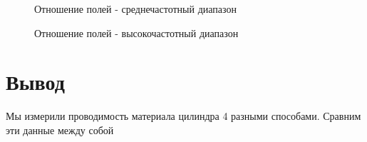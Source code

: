 \documentclass[a4paper]{article}
\begin{document}
\newpage

\begin{figure}[h]
    \caption{Отношение полей - среднечастотный диапазон}\label{fig:mid_freq_ratio}
    \caption{Отношение полей - высокочастотный диапазон}\label{fig:high_freq_ratio}
    \newpage
\end{figure}

\section{Вывод}
Мы измерили проводимость материала цилиндра 4 разными способами. Сравним эти данные
между собой
\end{document}
